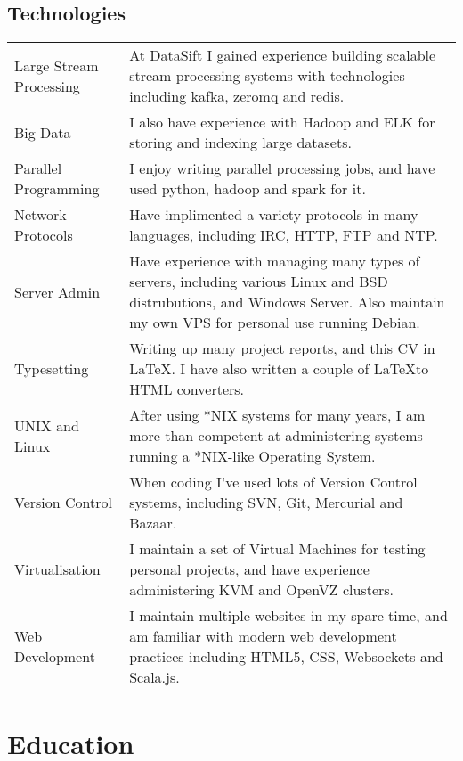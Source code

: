 \documentclass[a4paper]{article}
\renewenvironment{itemize}{
  \begin{list}{}{
    \setlength{\leftmargin}{1.5em}
  }
}{
  \end{list}
}
\begin{document}
\subsection*{Technologies}
\begin{tabular}{ l p{12.3cm} }
Large Stream Processing & At DataSift I gained experience building scalable stream processing systems with technologies including kafka, zeromq and redis.\\
Big Data & I also have experience with Hadoop and ELK for storing and indexing large datasets.\\
Parallel Programming & I enjoy writing parallel processing jobs, and have used python, hadoop and spark for it.\\
Network Protocols & Have implimented a variety protocols in many languages, including IRC, HTTP, FTP and NTP.\\
Server Admin & Have experience with managing many types of servers, including various Linux and BSD distrubutions, and Windows Server. Also maintain my own VPS for personal use running Debian.\\
Typesetting & Writing up many project reports, and this CV in \LaTeX. I have also written a couple of \LaTeX to HTML converters.\\
UNIX and Linux & After using *NIX systems for many years, I am more than competent at administering systems running a *NIX-like Operating System.\\
Version Control & When coding I've used lots of Version Control systems, including SVN, Git, Mercurial and Bazaar.\\
Virtualisation & I maintain a set of Virtual Machines for testing personal projects, and have experience administering KVM and OpenVZ clusters.\\
Web Development & I maintain multiple websites in my spare time, and am familiar with modern web development practices including HTML5, CSS, Websockets and Scala.js.\\
\end{tabular}



\pagebreak

\section*{Education}
\end{document}
